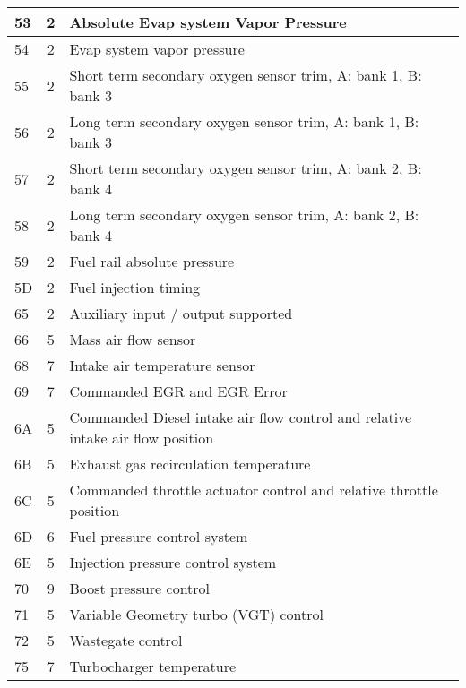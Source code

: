 \begin{longtable}{|l|c|p{10cm}|}
    53 & 2  & Absolute Evap system Vapor Pressure                           \\ \hline
    54 & 2  & Evap system vapor pressure                                    \\ \hline
    55 & 2  & Short term secondary oxygen sensor trim, A: bank 1, B: bank 3 \\ \hline
    56 & 2  & Long term secondary oxygen sensor trim, A: bank 1, B: bank 3  \\ \hline
    57 & 2  & Short term secondary oxygen sensor trim, A: bank 2, B: bank 4 \\ \hline
    58 & 2  & Long term secondary oxygen sensor trim, A: bank 2, B: bank 4  \\ \hline
    59 & 2  & Fuel rail absolute pressure                                   \\ \hline
    5D & 2  & Fuel injection timing                                         \\ \hline
    65 & 2  & Auxiliary input / output supported                            \\ \hline
    66 & 5  & Mass air flow sensor                                          \\ \hline
    68 & 7  & Intake air temperature sensor                                 \\ \hline
    69 & 7  & Commanded EGR and EGR Error                                   \\ \hline
    6A & 5  & Commanded Diesel intake air flow control and relative intake air flow position \\ \hline
    6B & 5  & Exhaust gas recirculation temperature                         \\ \hline
    6C & 5  & Commanded throttle actuator control and relative throttle position \\ \hline
    6D & 6  & Fuel pressure control system                                  \\ \hline
    6E & 5  & Injection pressure control system                             \\ \hline
    70 & 9  & Boost pressure control                                        \\ \hline
    71 & 5  & Variable Geometry turbo (VGT) control                         \\ \hline
    72 & 5  & Wastegate control                                             \\ \hline
    75 & 7  & Turbocharger temperature                                      \\ \hline

\end{longtable}
